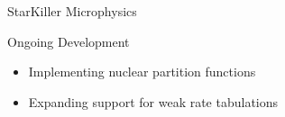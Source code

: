 \documentclass[final]{beamer}
\newlength{\sepwid}
\newlength{\onecolwid}
\newlength{\twocolwid}
\begin{document}
\begin{frame}[t]
\begin{columns}[t]
\begin{column}{\twocolwid}
\begin{columns}[t,totalwidth=\twocolwid]
\begin{column}{\onecolwid}
\begin{block}{StarKiller Microphysics}
\end{block}

\begin{block}{Ongoing Development}

\begin{itemize}
    \item Implementing nuclear partition functions
    \item Expanding support for weak rate tabulations
\end{itemize}


\end{block}


\end{column} %

\end{columns} %






\end{column} %

\begin{column}{\sepwid}\end{column} %


\end{columns}
\end{frame}
\end{document}
